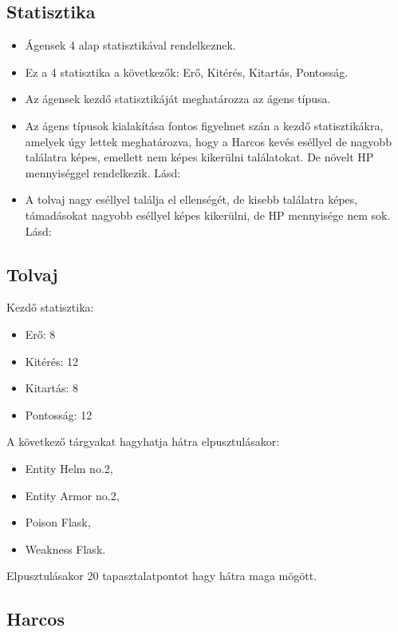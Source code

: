 \subsection{Statisztika}

\begin{itemize}
    \item Ágensek 4 alap statisztikával rendelkeznek.
    \item Ez a 4 statisztika a következők: Erő, Kitérés, Kitartás, Pontosság.
    \item Az ágensek kezdő statisztikáját meghatározza az ágens típusa.
    \item Az ágens típusok kialakítása fontos figyelmet szán a kezdő statisztikákra, amelyek úgy lettek meghatározva, hogy a Harcos kevés eséllyel de nagyobb találatra képes, emellett nem képes kikerülni találatokat. De növelt HP mennyiséggel rendelkezik. Lásd: 
    \item A tolvaj nagy eséllyel találja el ellenségét, de kisebb találatra képes, támadásokat nagyobb eséllyel képes kikerülni, de HP mennyisége nem sok. Lásd: 
\end{itemize}

\subsection{Tolvaj}

\noindent Kezdő statisztika:
\begin{itemize}
    \item Erő: 8
    \item Kitérés: 12
    \item Kitartás: 8
    \item Pontosság: 12
\end{itemize}

\noindent A következő tárgyakat hagyhatja hátra elpusztulásakor:

\begin{itemize}
    \item Entity Helm no.2,
    \item Entity Armor no.2,
    \item Poison Flask,
    \item Weakness Flask.
\end{itemize}

\noindent Elpusztulásakor 20 tapasztalatpontot hagy hátra maga mögött.

\subsection{Harcos}

